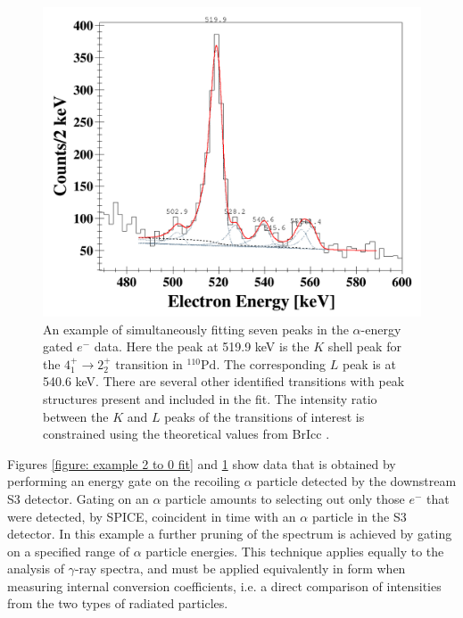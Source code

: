 \begin{figure}[!ht]
  \centering
  \includegraphics[width=\textwidth]{techniques_fit_constrained.png}
  \caption[An example of simultaneously fitting seven peaks in the $\alpha$-energy gated $e^-$ data. The $K$ to $L$ peak intensity ratios are constrained.]{An example of simultaneously fitting seven peaks in the $\alpha$-energy gated $e^-$ data. Here the peak at 519.9 keV is the $K$ shell peak for the $4^+_1 \rightarrow 2^+_2$ transition in $^{110}\mathrm{Pd}$. The corresponding $L$ peak is at 540.6 keV. There are several other identified transitions with peak structures present and included in the fit. The intensity ratio between the $K$ and $L$ peaks of the transitions of interest is constrained using the theoretical values from BrIcc \cite{KIBEDI2008202}.}
  \label{figure: example constrained fit}
\end{figure}

Figures \ref{figure: example 2 to 0 fit} and \ref{figure: example constrained fit} show data that is obtained by performing an energy gate on the recoiling $\alpha$ particle detected by the downstream S3 detector. Gating on an $\alpha$ particle amounts to selecting out only those $e^-$ that were detected, by SPICE, coincident in time with an $\alpha$ particle in the S3 detector. In this example a further pruning of the spectrum is achieved by gating on a specified range of $\alpha$ particle energies. This technique applies equally to the analysis of $\gamma$-ray spectra, and must be applied equivalently in form when measuring internal conversion coefficients, i.e. a direct comparison of intensities from the two types of radiated particles. 

